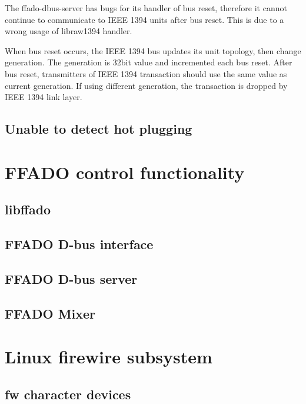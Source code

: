 \documentclass[onecolumn]{article}
\begin{document}
The ffado-dbus-server has bugs for its handler of bus reset, therefore it cannot continue to communicate to IEEE 1394 units after bus reset. This is due to a wrong usage of libraw1394 handler.

When bus reset occurs, the IEEE 1394 bus updates its unit topology, then change generation. The generation is 32bit value and incremented each bus reset. After bus reset, transmitters of IEEE 1394 transaction should use the same value as current generation. If using different generation, the transaction is dropped by IEEE 1394 link layer.

\subsection{Unable to detect hot plugging}


\section{FFADO control functionality}

\subsection{libffado}

\subsection{FFADO D-bus interface}

\subsection{FFADO D-bus server}

\subsection{FFADO Mixer}

\section{}

\section{Linux firewire subsystem}

\subsection{fw character devices}
\end{document}
